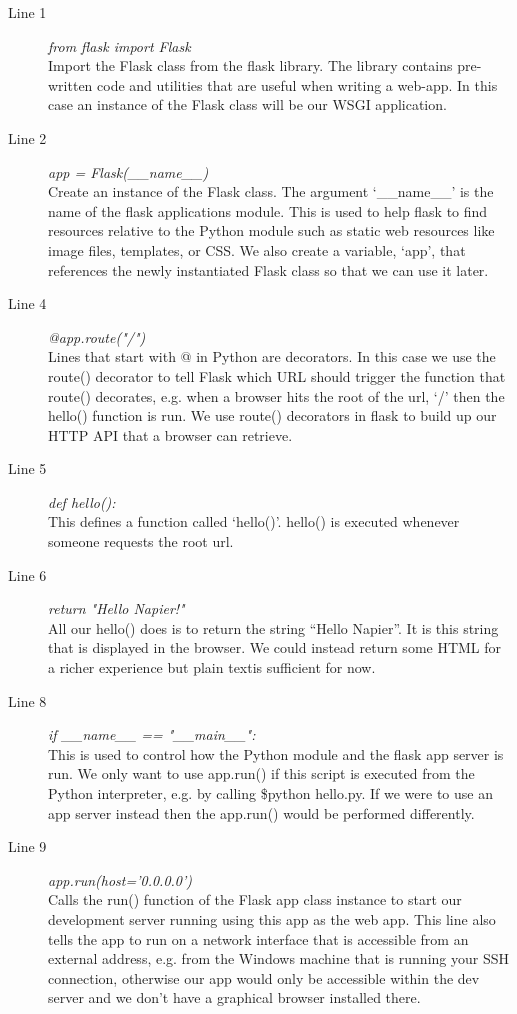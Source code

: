 \documentclass[12pt, a4paper, oneside]{book}
\begin{document}
\begin{description}
\item[Line 1] \emph{from flask import Flask}\\ 
Import the Flask class from the flask library. The library contains pre-written code and utilities that are useful when writing a web-app. In this case an instance of the Flask class will be our WSGI application.
\item[Line 2] \emph{app = Flask(\_\_name\_\_)}\\
Create an instance of the Flask class. The argument `\_\_name\_\_' is the name of the flask applications module. This is used to help flask to find resources relative to the Python module such as static web resources like image files, templates, or CSS. We also create a variable, `app', that references the newly instantiated Flask class so that we can use it later.
\item[Line 4] \emph{@app.route("/")}\\
Lines that start with @ in Python are decorators. In this case we use the route() decorator to tell Flask which URL should trigger the function that route() decorates, e.g. when a browser hits the root of the url, `/' then the hello() function is run. We use route() decorators in flask to build up our HTTP API that a browser can retrieve.
\item[Line 5] \emph{def hello():}\\
This defines a function called `hello()'. hello() is executed whenever someone requests the root url.
\item[Line 6] \emph{return "Hello Napier!"}\\
All our hello() does is to return the string ``Hello Napier''. It is this string that is displayed in the browser. We could instead return some HTML for a richer experience but plain textis sufficient for now.
\item[Line 8] \emph{if \_\_name\_\_ == "\_\_main\_\_":}\\
This is used to control how the Python module and the flask app server is run. We only want to use app.run() if this script is executed from the Python interpreter, e.g. by calling \$python hello.py. If we were to use an app server instead then the app.run() would be performed differently.
\item[Line 9] \emph{app.run(host='0.0.0.0')
}\\
Calls the run() function of the Flask app class instance to start our development server running using this app as the web app. This line also tells the app to run on a network interface that is accessible from an external address, e.g. from the Windows machine that is running your SSH connection, otherwise our app would only be accessible within the dev server and we don't have a graphical browser installed there.
\end{description}
\end{document}
